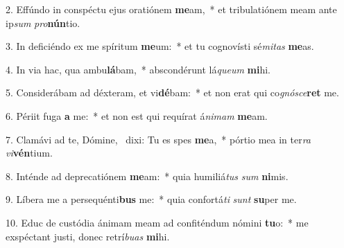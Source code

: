 2. Effúndo in conspéctu ejus oratiónem \textbf{me}am,~*  et tribulatiónem meam ante ip\textit{sum} \textit{pro}\textbf{nún}tio.\

3. In deficiéndo ex me spíritum \textbf{me}um:~*  et tu cognovísti sé\textit{mi}\textit{tas} \textbf{me}as.\

4. In via hac, qua ambu\textbf{lá}bam,~*  abscondérunt lá\textit{que}\textit{um} \textbf{mi}hi.\

5. Considerábam ad déxteram, et vi\textbf{dé}bam:~*  et non erat qui co\textit{gnó}\textit{sce}\textbf{ret} me.\

6. Périit fuga \textbf{a} me:~*  et non est qui requírat á\textit{ni}\textit{mam} \textbf{me}am.\

7. Clamávi ad te, Dómine, \dag\  dixi: Tu es spes \textbf{me}a,~*  pórtio mea in ter\textit{ra} \textit{vi}\textbf{vén}tium.\

8. Inténde ad deprecatiónem \textbf{me}am:~*  quia humiliá\textit{tus} \textit{sum} \textbf{ni}mis.\

9. Líbera me a persequénti\textbf{bus} me:~*  quia confortá\textit{ti} \textit{sunt} \textbf{su}per me.\

10. Educ de custódia ánimam meam ad confiténdum nómini \textbf{tu}o:~*  me exspéctant justi, donec retrí\textit{bu}\textit{as} \textbf{mi}hi.\

